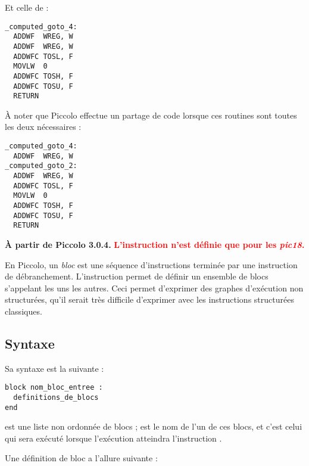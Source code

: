 Et celle de  :
\begin{lstlisting}[language=assembleur]
_computed_goto_4:
  ADDWF  WREG, W
  ADDWF  WREG, W
  ADDWFC TOSL, F
  MOVLW  0
  ADDWFC TOSH, F
  ADDWFC TOSU, F
  RETURN
\end{lstlisting}

À noter que Piccolo effectue un partage de code lorsque ces routines sont toutes les deux nécessaires :
\begin{lstlisting}[language=assembleur]
_computed_goto_4:
  ADDWF  WREG, W
_computed_goto_2:
  ADDWF  WREG, W
  ADDWFC TOSL, F
  MOVLW  0
  ADDWFC TOSH, F
  ADDWFC TOSU, F
  RETURN
\end{lstlisting}













\textbf{À partir de Piccolo 3.0.4.} \textcolor{red}{\bf L'instruction  n'est définie que pour les \emph{pic18}.}

En Piccolo, un \emph{bloc} est une séquence d'instructions terminée par une instruction de débranchement. L'instruction  permet de définir un ensemble de blocs s'appelant les uns les autres. Ceci permet d'exprimer des graphes d'exécution non structurées, qu'il serait très difficile d'exprimer avec les instructions structurées classiques. 

\subsection{Syntaxe}

Sa syntaxe est la suivante :


\begin{lstlisting}[language=piccolo]
block nom_bloc_entree :
  definitions_de_blocs
end
\end{lstlisting}

 est une liste non ordonnée de blocs ;  est le nom de l'un de ces blocs, et c'est celui qui sera exécuté lorsque l'exécution atteindra l'instruction .

Une définition de bloc a l'allure suivante :

